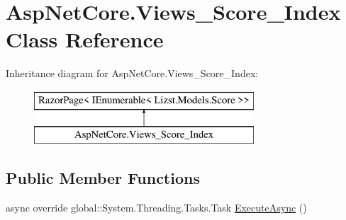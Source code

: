 \hypertarget{class_asp_net_core_1_1_views___score___index}{}\section{Asp\+Net\+Core.\+Views\+\_\+\+Score\+\_\+\+Index Class Reference}
\label{class_asp_net_core_1_1_views___score___index}
Inheritance diagram for Asp\+Net\+Core.\+Views\+\_\+\+Score\+\_\+\+Index\+:\begin{figure}[H]
\begin{center}
\leavevmode
\includegraphics[height=2.000000cm]{class_asp_net_core_1_1_views___score___index}
\end{center}
\end{figure}
\subsection*{Public Member Functions}
\begin{DoxyCompactItemize}
\item 
async override global\+::\+System.\+Threading.\+Tasks.\+Task \mbox{\hyperlink{class_asp_net_core_1_1_views___score___index_a9f16a3d32b67377928388d02e95171de}{Execute\+Async}} ()
\end{DoxyCompactItemize}

